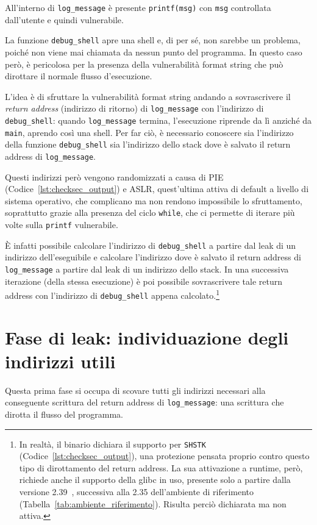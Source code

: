 All'interno di \texttt{log\_message} è presente \texttt{printf(msg)} con \texttt{msg} controllata dall'utente e quindi vulnerabile.

La funzione \texttt{debug\_shell} apre una shell e, di per sé, non sarebbe un problema, poiché non viene mai chiamata da nessun punto del programma. In questo caso però, è pericolosa per la presenza della vulnerabilità format string che può dirottare il normale flusso d'esecuzione.

L'idea è di sfruttare la vulnerabilità format string andando a sovrascrivere il \emph{return address} (indirizzo di ritorno) di \texttt{log\_message} con l'indirizzo di \texttt{debug\_shell}: quando \texttt{log\_message} termina, l'esecuzione riprende da lì anziché da \texttt{main}, aprendo così una shell.
Per far ciò, è necessario conoscere sia l'indirizzo della funzione \texttt{debug\_shell} sia l'indirizzo dello stack dove è salvato il return address di \texttt{log\_message}.

Questi indirizzi però vengono randomizzati a causa di PIE (Codice~\ref{lst:checksec_output}) e ASLR, quest'ultima attiva di default a livello di sistema operativo, che complicano ma non rendono impossibile lo sfruttamento, soprattutto grazie alla presenza del ciclo \texttt{while}, che ci permette di iterare più volte sulla \texttt{printf} vulnerabile.

È infatti possibile calcolare l'indirizzo di \texttt{debug\_shell} a partire dal leak di un indirizzo dell'eseguibile e calcolare l'indirizzo dove è salvato il return address di \texttt{log\_message} a partire dal leak di un indirizzo dello stack. In una successiva iterazione (della stessa esecuzione) è poi possibile sovrascrivere tale return address con l'indirizzo di \texttt{debug\_shell} appena calcolato.\footnote{In realtà, il binario dichiara il supporto per \texttt{SHSTK} (Codice~\ref{lst:checksec_output}), una protezione pensata proprio contro questo tipo di dirottamento del return address. La sua attivazione a runtime, però, richiede anche il supporto della glibc in uso, presente solo a partire dalla versione 2.39~\cite{glibc2024}, successiva alla 2.35 dell'ambiente di riferimento (Tabella~\ref{tab:ambiente_riferimento}). Risulta perciò dichiarata ma non attiva.}


\section{Fase di leak: individuazione degli indirizzi utili}\label{sec:leak_phase}
Questa prima fase si occupa di scovare tutti gli indirizzi necessari alla conseguente scrittura del return address di \texttt{log\_message}: una scrittura che dirotta il flusso del programma.

